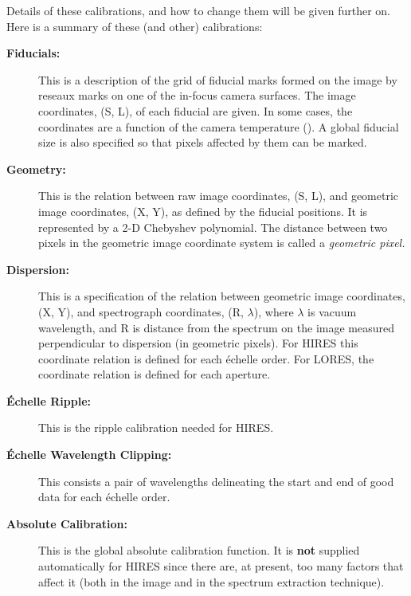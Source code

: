 Details of these calibrations, and how to change them will be given
further on. Here is a summary of these (and other) calibrations:

\begin{description}

\item [{\bf Fiducials:}]
      This is a description of the grid of fiducial marks formed
      on the image by reseaux marks on one of the in-focus camera surfaces.
      The image coordinates, (S, L), of each fiducial are given.  In some 
      cases, the coordinates are a function of the camera temperature
      ()\@.
      A global fiducial size is also specified so that pixels affected by 
      them can be marked.

\item [{\bf Geometry:}]
      This is the relation between raw image coordinates, (S, L),
      and geometric image coordinates, (X, Y), as defined by the fiducial
      positions.  It is represented by a 2-D Chebyshev polynomial.  The
      distance between two pixels in the geometric image coordinate system is
      called a {\em geometric pixel.}

\item [{\bf Dispersion:}]
      This is a specification of the relation between geometric
      image coordinates, (X, Y), and spectrograph coordinates, (R, $\lambda$),
      where $\lambda$ is vacuum wavelength, and R is distance from the spectrum
      on the image measured perpendicular to dispersion (in geometric
      pixels)\@.  For HIRES this coordinate relation is defined for each
      \'{e}chelle order.  For LORES, the coordinate relation is defined for
      each aperture.

\item [{\bf \'{E}chelle Ripple:}]
      This is the ripple calibration needed for HIRES.

\item [{\bf \'{E}chelle Wavelength Clipping:}]
      This consists a pair of wavelengths
      delineating the start and end of good data for each \'{e}chelle
      order.

\item [{\bf Absolute Calibration:}]
      This is the global absolute calibration function.
      It is {\bf not} supplied automatically for HIRES since there are, at
      present, too many factors that affect it (both in the image and in the
      spectrum extraction technique)\@.


\end{description}
